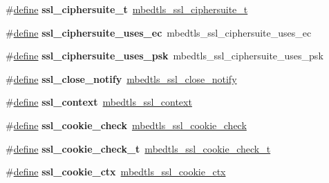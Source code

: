 \begin{DoxyCompactItemize}
\item 
\mbox{\label{compat-1_83_8h_ad8b5097251c16ca81e91376cd6d05337}} 
\#\hyperlink{structdefine}{define} {\bfseries ssl\+\_\+ciphersuite\+\_\+t}~\hyperlink{structmbedtls__ssl__ciphersuite__t}{mbedtls\+\_\+ssl\+\_\+ciphersuite\+\_\+t}
\item 
\mbox{\label{compat-1_83_8h_a58ea3a3a1389c6053b5c0c0de58b7b1c}} 
\#\hyperlink{structdefine}{define} {\bfseries ssl\+\_\+ciphersuite\+\_\+uses\+\_\+ec}~mbedtls\+\_\+ssl\+\_\+ciphersuite\+\_\+uses\+\_\+ec
\item 
\mbox{\label{compat-1_83_8h_a669f514dda87c0cc2ebab447f2e32844}} 
\#\hyperlink{structdefine}{define} {\bfseries ssl\+\_\+ciphersuite\+\_\+uses\+\_\+psk}~mbedtls\+\_\+ssl\+\_\+ciphersuite\+\_\+uses\+\_\+psk
\item 
\mbox{\label{compat-1_83_8h_a89279581d264bd1cd116ef7de95e7144}} 
\#\hyperlink{structdefine}{define} {\bfseries ssl\+\_\+close\+\_\+notify}~\hyperlink{ssl_8h_ac2c1b17128ead2df3082e27b603deb4c}{mbedtls\+\_\+ssl\+\_\+close\+\_\+notify}
\item 
\mbox{\label{compat-1_83_8h_a33956cb724e6d0fda00f6109f8274223}} 
\#\hyperlink{structdefine}{define} {\bfseries ssl\+\_\+context}~\hyperlink{structmbedtls__ssl__context}{mbedtls\+\_\+ssl\+\_\+context}
\item 
\mbox{\label{compat-1_83_8h_a060dbceec05bf37b04ca1cc6d13a96e5}} 
\#\hyperlink{structdefine}{define} {\bfseries ssl\+\_\+cookie\+\_\+check}~\hyperlink{ssl__cookie_8h_ac83489027c04984e12f89b1b29eac27b}{mbedtls\+\_\+ssl\+\_\+cookie\+\_\+check}
\item 
\mbox{\label{compat-1_83_8h_a890378346dbc084eaa926c719b9eb3fc}} 
\#\hyperlink{structdefine}{define} {\bfseries ssl\+\_\+cookie\+\_\+check\+\_\+t}~\hyperlink{ssl_8h_a9cfda5aee70d6c2c19a8dfb5af900d80}{mbedtls\+\_\+ssl\+\_\+cookie\+\_\+check\+\_\+t}
\item 
\mbox{\label{compat-1_83_8h_aac80805a806cc43dcaaa74aef15b30af}} 
\#\hyperlink{structdefine}{define} {\bfseries ssl\+\_\+cookie\+\_\+ctx}~\hyperlink{structmbedtls__ssl__cookie__ctx}{mbedtls\+\_\+ssl\+\_\+cookie\+\_\+ctx}

\end{DoxyCompactItemize}
